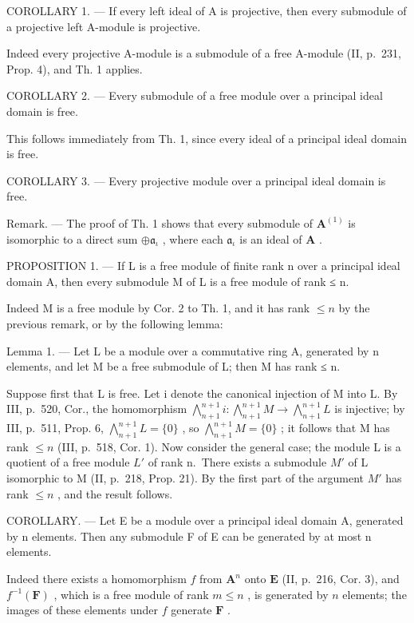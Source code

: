 COROLLARY 1. --- If every left ideal of A is projective, then every submodule of a projective left A-module is projective.

Indeed every projective A-module is a submodule of a free A-module (II, p.~231, Prop. 4), and Th. 1 applies.

COROLLARY 2. --- Every submodule of a free module over a principal ideal domain is free.

This follows immediately from Th. 1, since every ideal of a principal ideal domain is free.

COROLLARY 3. --- Every projective module over a principal ideal domain is free.

Remark. --- The proof of Th. 1 shows that every submodule of \(\mathbf{A}^{(1)}\) is isomorphic to a direct sum \(\oplus \mathfrak{a}_{\iota}\) , where each \(\mathfrak{a}_{\iota}\) is an ideal of \(\mathbf{A}\) .

PROPOSITION 1. --- If L is a free module of finite rank n over a principal ideal domain A, then every submodule M of L is a free module of rank ≤ n.

Indeed M is a free module by Cor. 2 to Th. 1, and it has rank \(\leqslant n\) by the previous remark, or by the following lemma:

Lemma 1. --- Let L be a module over a commutative ring A, generated by n elements, and let M be a free submodule of L; then M has rank ≤ n.

Suppose first that L is free. Let i denote the canonical injection of M into L. By III, p.~520, Cor., the homomorphism \(\bigwedge_{n+1}^{n+1} i: \bigwedge_{n+1}^{n+1} M \to \bigwedge_{n+1}^{n+1} L\) is injective; by III, p.~511, Prop. 6, \(\bigwedge_{n+1}^{n+1} L = \{0\}\) , so \(\bigwedge_{n+1}^{n+1} M = \{0\}\) ; it follows that M has rank \(\leqslant n\) (III, p.~518, Cor. 1). Now consider the general case; the module L is a quotient of a free module \(L'\) of rank n.~There exists a submodule \(M'\) of L isomorphic to M (II, p.~218, Prop. 21). By the first part of the argument \(M'\) has rank \(\leqslant n\) , and the result follows.

COROLLARY. --- Let E be a module over a principal ideal domain A, generated by n elements. Then any submodule F of E can be generated by at most n elements.

Indeed there exists a homomorphism \(f\) from \(\mathbf{A}^n\) onto \(\mathbf{E}\) (II, p.~216, Cor. 3), and \(f^{-1}(\mathbf{F})\) , which is a free module of rank \(m \leqslant n\) , is generated by \(n\) elements; the images of these elements under \(f\) generate \(\mathbf{F}\) .

